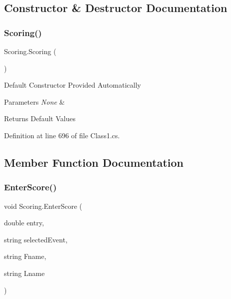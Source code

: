 \subsection{Constructor \& Destructor Documentation}
\mbox{\label{classScoring_af50c5086e741aef0bb7b8c91e2d3f2f2}} 
\subsubsection{\texorpdfstring{Scoring()}{Scoring()}}
{\footnotesize\ttfamily Scoring.\+Scoring (\begin{DoxyParamCaption}{ }\end{DoxyParamCaption})\hspace{0.3cm}{\ttfamily [inline]}}

Default Constructor Provided Automatically 
\begin{DoxyParams}{Parameters}
{\em None} & \\
\hline
\end{DoxyParams}
\begin{DoxyReturn}{Returns}
Default Values 
\end{DoxyReturn}


Definition at line 696 of file Class1.\+cs.



\subsection{Member Function Documentation}
\mbox{\label{classScoring_a0943ddd7d6181c24c03c98c257cd6354}} 
\subsubsection{\texorpdfstring{Enter\+Score()}{EnterScore()}}
{\footnotesize\ttfamily void Scoring.\+Enter\+Score (\begin{DoxyParamCaption}\item[{double}]{entry,  }\item[{string}]{selected\+Event,  }\item[{string}]{Fname,  }\item[{string}]{Lname }\end{DoxyParamCaption})\hspace{0.3cm}{\ttfamily [inline]}}

